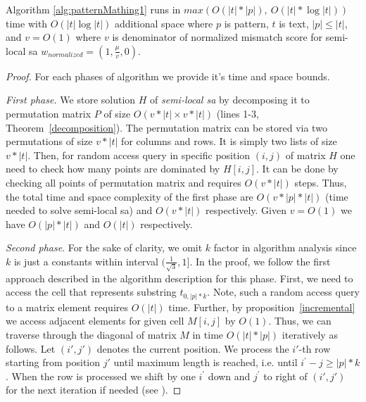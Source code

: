 \begin{theorem}
Algorithm \ref{alg:patternMathing1} runs in $max(O(|t|*|p|),\ O(|t| * \log |t|))$ time with $O( |t| \log |t|)$ additional space where $p$ is pattern, $t$ is text, $|p| \leq |t|$, and $v=O(1)$ where $v$ is denominator of normalized mismatch score for semi-local sa $w_{normalized} = (1,\frac{\mu}{v},0)$.
\end{theorem}
\begin{proof}
  For each phases of algorithm we provide it's time and space bounds.
  
\emph{First phase.}
We store solution $H$ of \emph{semi-local sa} by decomposing it to permutation matrix $P$ of size $O(v*|t| \times v*|t|)$ (lines 1-3, Theorem~\ref{decomposition}).
The permutation matrix can be stored via two permutations of size $v*|t|$ for columns and rows.
It is simply two lists of size $v*|t|$.
Then, for random access query in specific position $(i,j)$ of matrix $H$ one need to check how many points are dominated by $H [i,j]$.
It can be done by checking all points of permutation matrix and requires $O(v * |t|)$ steps.
Thus, the total time and space complexity of the first phase are $O(v *|p| * |t|)$ (time needed to solve semi-local sa) and $O(v*|t|)$ respectively.
Given $v=O(1)$ we have $O(|p| * |t|)$ and $O(|t|)$ respectively.



\emph{Second phase}.
For the sake of clarity, we omit $k$ factor in algorithm analysis since $k$ is just a constants within interval $(\frac{1}{\sqrt{3}},1]$.
In the proof, we follow the first approach described in the algorithm description for this phase.
First, we need to access the cell that represents substring $t_{0,|p|*k}$.
Note, such a random access query to a matrix element requires $O(|t|)$ time.
Further, by  proposition~\ref{incremental} we access adjacent elements for given cell $M[i,j]$ by $O(1)$.
Thus, we can traverse through the diagonal of matrix $M$ in time $O(|t|*|p|)$ iteratively as follows.
Let $(i',j')$ denotes the current position.
We process the $i'$-th row starting from position $j'$ until maximum length is reached, i.e. until $i^{'}-j \geq |p|*k$.
When the row is processed we shift by one $i^{'}$ down and $j^{'}$ to right of $(i',j')$ for the next iteration if needed (see  ).


\end{proof}
